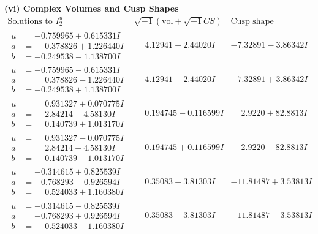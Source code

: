 \documentclass[1p]{elsarticle_modified}
\theoremstyle{definition}
\newcommand{\I}{\sqrt{-1}}
\begin{document}
\newpage\flushleft \textbf{(vi) Complex Volumes and Cusp Shapes}
$$\begin{array}{c|c|c}  
\text{Solutions to }I^u_{2}& \I (\text{vol} + \sqrt{-1}CS) & \text{Cusp shape}\\
 \hline 
\begin{aligned}
u &= -0.759965 + 0.615331 I \\
a &= \phantom{-}0.378826 + 1.226440 I \\
b &= -0.249538 - 1.138700 I\end{aligned}
 & \phantom{-}4.12941 + 2.44020 I & -7.32891 - 3.86342 I \\ \hline\begin{aligned}
u &= -0.759965 - 0.615331 I \\
a &= \phantom{-}0.378826 - 1.226440 I \\
b &= -0.249538 + 1.138700 I\end{aligned}
 & \phantom{-}4.12941 - 2.44020 I & -7.32891 + 3.86342 I \\ \hline\begin{aligned}
u &= \phantom{-}0.931327 + 0.070775 I \\
a &= \phantom{-}2.84214 - 4.58130 I \\
b &= \phantom{-}0.140739 + 1.013170 I\end{aligned}
 & \phantom{-}0.194745 - 0.116599 I & \phantom{-}2.9220 + 82.8813 I \\ \hline\begin{aligned}
u &= \phantom{-}0.931327 - 0.070775 I \\
a &= \phantom{-}2.84214 + 4.58130 I \\
b &= \phantom{-}0.140739 - 1.013170 I\end{aligned}
 & \phantom{-}0.194745 + 0.116599 I & \phantom{-}2.9220 - 82.8813 I \\ \hline\begin{aligned}
u &= -0.314615 + 0.825539 I \\
a &= -0.768293 - 0.926594 I \\
b &= \phantom{-}0.524033 + 1.160380 I\end{aligned}
 & \phantom{-}0.35083 - 3.81303 I & -11.81487 + 3.53813 I \\ \hline\begin{aligned}
u &= -0.314615 - 0.825539 I \\
a &= -0.768293 + 0.926594 I \\
b &= \phantom{-}0.524033 - 1.160380 I\end{aligned}
 & \phantom{-}0.35083 + 3.81303 I & -11.81487 - 3.53813 I \\ \hline\begin{aligned}

\end{aligned}
\end{array}$$
\end{document}
